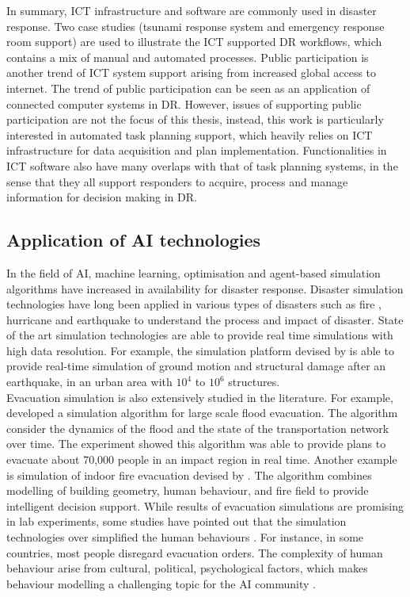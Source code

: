 In summary, \ac{ICT} infrastructure and software are commonly used in disaster response. Two case studies (tsunami response system and emergency response room support) are used to illustrate the \ac{ICT} supported \ac{DR} workflows, which contains a mix of manual and automated processes. Public participation is another trend of \ac{ICT} system support arising from increased global access to internet. The trend of public participation can be seen as an application of connected computer systems in \ac{DR}. However, issues of supporting public participation are not the focus of this thesis, instead, this work is particularly interested in automated task planning support, which heavily relies on \ac{ICT} infrastructure for data acquisition and plan implementation. Functionalities in \ac{ICT} software also have many overlaps with that of task planning systems, in the sense that they all support responders to acquire, process and manage information for decision making in \ac{DR}. \\


\subsection{Application of AI technologies}\label{sec:lraisupport}
In the field of \ac{AI}, machine learning, optimisation and agent-based simulation algorithms have increased in availability for disaster response. Disaster simulation technologies \citep{Okaya,Scerri2005} have long been applied in various types of disasters such as fire \citep{Tang2012}, hurricane \citep{Vickery2009} and earthquake \citep{Sobhaninejad2011} to understand the process and impact of disaster. State of the art simulation technologies are able to provide real time simulations with high data resolution. For example, the simulation platform devised by \citep{Sobhaninejad2011} is able to provide real-time simulation of ground motion and structural damage after an earthquake, in an urban area with $10^{4}$ to $10^{6}$ structures. \\

Evacuation simulation is also extensively studied in the literature. For example, \cite{Pillac2015} developed a simulation algorithm for large scale flood evacuation. The algorithm consider the dynamics of the flood and the state of the transportation network over time. The experiment showed this algorithm was able to provide plans to evacuate about 70,000 people in an impact region in real time.  Another example is simulation of indoor fire evacuation devised by \cite{Tang2012}.  The algorithm combines modelling of building geometry, human behaviour, and fire field to provide intelligent decision support. While results of evacuation simulations are promising in lab experiments, some studies have pointed out that the simulation technologies over simplified the human behaviours \citep{Hentenryck2011}. For instance, in some countries, most people disregard evacuation orders. The complexity of human behaviour arise from cultural, political, psychological factors, which makes behaviour modelling a challenging topic for the \ac{AI} community \citep{Provitolo2011} . \\

